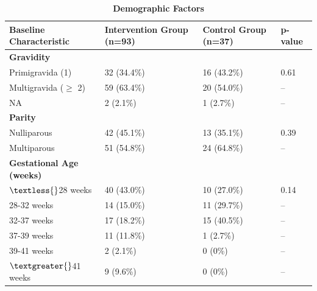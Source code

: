 \documentclass[12pt]{article}
\begin{document}
\captionsetup{justification=raggedright, singlelinecheck=false, skip=0pt, labelfont=bf}
\begin{table}[htbp]
    \caption{\textbf{Demographic Factors}}
    \begin{threeparttable}
        \small
        \begin{tabularx}{\textwidth}{>{\raggedright\arraybackslash}Xlll}
            \toprule
            \textbf{Baseline Characteristic} & \textbf{Intervention Group (n=93)} & \textbf{Control Group (n=37)} & \textbf{p-value} \\
            \midrule
            \textbf{Gravidity} &  &  &  \\
            \hspace{1em} Primigravida (1) & 32 (34.4\%) & 16 (43.2\%) & 0.61 \\
            \hspace{1em} Multigravida ($\geq$ 2) & 59 (63.4\%) & 20 (54.0\%) & -- \\
            \hspace{1em} NA\tnote{1} & 2 (2.1\%) & 1 (2.7\%) & -- \\
            \midrule
            \textbf{Parity} &  &  &  \\
            \hspace{1em} Nulliparous & 42 (45.1\%) & 13 (35.1\%) & 0.39 \\
            \hspace{1em} Multiparous & 51 (54.8\%) & 24 (64.8\%) & -- \\
            \midrule
            \textbf{Gestational Age (weeks)} &  &  &  \\
            \hspace{1em} $\textless{}$28 weeks & 40 (43.0\%) & 10 (27.0\%) & 0.14 \\
            \hspace{1em} 28-32 weeks & 14 (15.0\%) & 11 (29.7\%) & -- \\
            \hspace{1em} 32-37 weeks & 17 (18.2\%) & 15 (40.5\%) & -- \\
            \hspace{1em} 37-39 weeks & 11 (11.8\%) & 1 (2.7\%) & -- \\
            \hspace{1em} 39-41 weeks & 2 (2.1\%) & 0 (0\%) & -- \\
            \hspace{1em} $\textgreater{}$41 weeks & 9 (9.6\%) & 0 (0\%) & -- \\

\end{tabularx}
\end{threeparttable}
\end{table}
\end{document}
